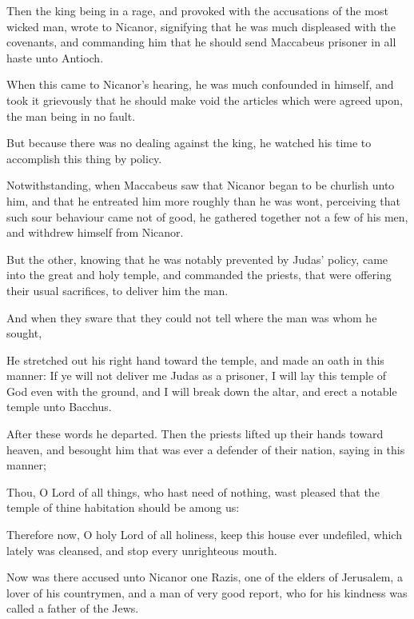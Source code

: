 {\par }{\PP {}Then the king being in a rage, and provoked with the accusations of the most wicked man, wrote to Nicanor, signifying that he was much displeased with the covenants, and commanding him that he should send Maccabeus prisoner in all haste unto Antioch.
\par }{\PP {}When this came to Nicanor’s hearing, he was much confounded in himself, and took it grievously that he should make void the articles which were agreed upon, the man being in no fault.
\par }{\PP {}But because there was no dealing against the king, he watched his time to accomplish this thing by policy.
\par }{\PP {}Notwithstanding, when Maccabeus saw that Nicanor began to be churlish unto him, and that he entreated him more roughly than he was wont, perceiving that such sour behaviour came not of good, he gathered together not a few of his men, and withdrew himself from Nicanor.
\par }{\PP {}But the other, knowing that he was notably prevented by Judas’ policy, came into the great and holy temple, and commanded the priests, that were offering their usual sacrifices, to deliver him the man.
\par }{\PP {}And when they sware that they could not tell where the man was whom he sought,
\par }{\PP {}He stretched out his right hand toward the temple, and made an oath in this manner: If ye will not deliver me Judas as a prisoner, I will lay this temple of God even with the ground, and I will break down the altar, and erect a notable temple unto Bacchus.
\par }{\PP {}After these words he departed. Then the priests lifted up their hands toward heaven, and besought him that was ever a defender of their nation, saying in this manner;
\par }{\PP {}Thou, O Lord of all things, who hast need of nothing, wast pleased that the temple of thine habitation should be among us:
\par }{\PP {}Therefore now, O holy Lord of all holiness, keep this house ever undefiled, which lately was cleansed, and stop every unrighteous mouth.
\par }{\PP {}Now was there accused unto Nicanor one Razis, one of the elders of Jerusalem, a lover of his countrymen, and a man of very good report, who for his kindness was called a father of the Jews.
}

